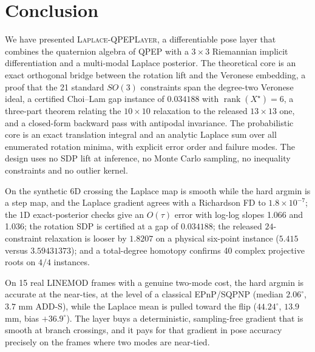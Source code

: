 \section{Conclusion}\label{sec:conclusion}

We have presented \textsc{Laplace-QPEPLayer}, a differentiable pose layer that combines the quaternion algebra of QPEP with a $3\times3$ Riemannian implicit differentiation and a multi-modal Laplace posterior. The theoretical core is an exact orthogonal bridge between the rotation lift and the Veronese embedding, a proof that the 21 standard $SO(3)$ constraints span the degree-two Veronese ideal, a certified Choi--Lam gap instance of $0.034188$ with $\operatorname{rank}(X^\star)=6$, a three-part theorem relating the $10\times10$ relaxation to the released $13\times13$ one, and a closed-form backward pass with antipodal invariance. The probabilistic core is an exact translation integral and an analytic Laplace sum over all enumerated rotation minima, with explicit error order and failure modes. The design uses no SDP lift at inference, no Monte Carlo sampling, no inequality constraints and no outlier kernel.

On the synthetic 6D crossing the Laplace map is smooth while the hard argmin is a step map, and the Laplace gradient agrees with a Richardson FD to $1.8\times10^{-7}$; the 1D exact-posterior checks give an $O(\tau)$ error with log-log slopes 1.066 and 1.036; the rotation SDP is certified at a gap of $0.034188$; the released $24$-constraint relaxation is looser by $1.8207$ on a physical six-point instance ($5.415$ versus $3.59431373$); and a total-degree homotopy confirms 40 complex projective roots on $4/4$ instances.

On 15 real LINEMOD frames with a genuine two-mode cost, the hard argmin is accurate at the near-ties, at the level of a classical EPnP/SQPNP (median $2.06^\circ$, $3.7$ mm ADD-S), while the Laplace mean is pulled toward the flip ($44.24^\circ$, $13.9$ mm, bias $+36.9^\circ$). The layer buys a deterministic, sampling-free gradient that is smooth at branch crossings, and it pays for that gradient in pose accuracy precisely on the frames where two modes are near-tied.
